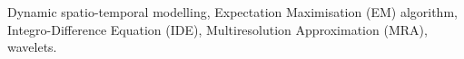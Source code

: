 \documentclass[journal,a4paper]{IEEEtran}
\begin{document}







\maketitle


\begin{abstract}
\end{abstract}

\begin{IEEEkeywords}
Dynamic spatio-temporal modelling, Expectation Maximisation (EM) algorithm, Integro-Difference Equation (IDE), Multiresolution Approximation (MRA), wavelets.
\end{IEEEkeywords}






%
\IEEEpeerreviewmaketitle
\end{document}
